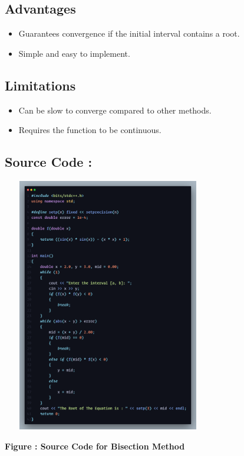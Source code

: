 \documentclass{scrreprt}
\begin{document}
\subsection*{Advantages}

\begin{itemize}
    \item Guarantees convergence if the initial interval contains a root.
    \item Simple and easy to implement.
\end{itemize}

\subsection*{Limitations}

\begin{itemize}
    \item Can be slow to converge compared to other methods.
    \item Requires the function to be continuous.
\end{itemize}

\subsection*{Source Code : }
\begin{center}
    {\includegraphics[width=350px, height=420px]{bisection_code.png}}
    \parbox{0.8\textwidth}{ 
        \centering
        \textbf{Figure : Source Code for Bisection Method}
    }
\end{center}
\end{document}
